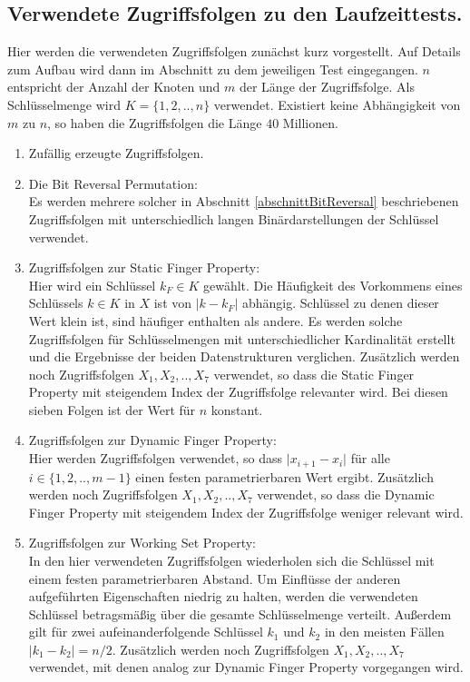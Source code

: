 \documentclass[a4paper,12pt]{article}
\begin{document}
\subsection{Verwendete Zugriffsfolgen zu den Laufzeittests.}
Hier werden die verwendeten Zugriffsfolgen zunächst kurz vorgestellt. Auf Details zum Aufbau wird dann im Abschnitt zu dem  jeweiligen Test eingegangen. $n$ entspricht der Anzahl der Knoten und $m$ der Länge der Zugriffsfolge. Als Schlüsselmenge wird $K = \{1,2,..,n\}$ verwendet. Existiert keine Abhängigkeit von $m$ zu $n$, so haben die Zugriffsfolgen die Länge $40$ Millionen. 

 \begin{enumerate}
 	\item Zufällig erzeugte Zugriffsfolgen.
 	\item Die Bit Reversal Permutation:\\
 	Es werden mehrere solcher in Abschnitt \ref{abschnittBitReversal} beschriebenen Zugriffsfolgen mit unterschiedlich langen Binärdarstellungen der Schlüssel verwendet.
 	\item Zugriffsfolgen zur Static Finger Property: \\
    Hier wird ein Schlüssel $k_F \in K$ gewählt. Die Häufigkeit des Vorkommens eines Schlüssels $k \in K$ in $X$ ist von $\vert k - k_F \vert$ abhängig. Schlüssel zu denen dieser Wert klein ist, sind häufiger enthalten als andere. Es werden solche Zugriffsfolgen für Schlüsselmengen mit unterschiedlicher Kardinalität erstellt und die Ergebnisse der beiden Datenstrukturen verglichen. Zusätzlich werden noch Zugriffsfolgen $X_1, X_2,.., X_7$ verwendet, so dass die Static Finger Property mit steigendem Index der Zugriffsfolge relevanter wird. Bei diesen sieben Folgen ist der Wert für $n$ konstant.
 	 \item Zugriffsfolgen zur Dynamic Finger Property:\\
 	Hier werden Zugriffsfolgen verwendet, so dass $\vert x_{i+1} - x_{i} \vert$ für alle \\
 	 \mbox{$i \in \{1, 2,..,m -1\} $} einen festen parametrierbaren Wert ergibt.  Zusätzlich werden noch Zugriffsfolgen $X_1, X_2,.., X_7$ verwendet, so dass die Dynamic Finger Property mit steigendem Index der Zugriffsfolge weniger relevant wird.
 	\item Zugriffsfolgen zur Working Set Property:\\
 	In den hier verwendeten Zugriffsfolgen wiederholen sich die Schlüssel mit einem festen parametrierbaren Abstand. Um Einflüsse der anderen aufgeführten Eigenschaften niedrig zu halten, werden die verwendeten Schlüssel betragsmäßig über die gesamte Schlüsselmenge verteilt. Außerdem gilt für zwei aufeinanderfolgende Schlüssel $k_1$ und $k_2$ in den meisten Fällen $\vert k_1 - k_2 \vert = n /2$. Zusätzlich werden noch Zugriffsfolgen $X_1, X_2,.., X_7$ verwendet, mit denen analog zur Dynamic Finger Property vorgegangen wird.

\end{enumerate}
\end{document}
